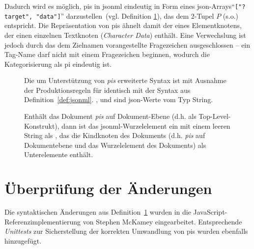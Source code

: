 Dadurch wird es möglich, \glspl{pi} in \acrshort{jsonml} eindeutig in Form eines \acrshort{json}-Arrays\linebreak{}\enquote{\texttt{["?target", "data"]}} darzustellen~(vgl. Definition \ref{def:jsonmlpi}), das dem 2-Tupel $P$ (s.o.) entspricht. Die Repräsentation von \glspl{pi} ähnelt damit der eines Elementknotens, der einen einzelnen Textknoten (\emph{Character Data}) enthält. Eine Verwechslung ist jedoch durch das dem Zielnamen vorangestellte Fragezeichen ausgeschlossen -- ein Tag-Name darf nicht mit einem Fragezeichen beginnen, wodurch die Kategorisierung als \gls{pi} eindeutig ist.  \begin{figure}[h]
    \begin{definition}
        \label{def:jsonmlpi}

        Die um Unterstützung von \emph{\glspl{pi}} erweiterte Syntax ist mit Ausnahme der Produktionsregeln für  identisch mit der Syntax aus Definition~\ref{def:jsonml}.
        ,  und  sind \acrshort{json}-Werte vom Typ String.

        \begin{grammar}
            
        \end{grammar}

        Enthält das Dokument \emph{\glspl{pi}} auf Dokument-Ebene (d.h. als Top-Level-Konstrukt), dann ist das \acrshort{jsonml}-Wurzelelement ein  mit einem leeren String als , das die Kindknoten des Dokuments (d.h. \emph{\glspl{pi}} auf Dokumentebene und das Wurzelelement des Dokuments) als Unterelemente enthält.
    \end{definition}
\end{figure}

\section{Überprüfung der Änderungen}

Die syntaktischen Änderungen aus Definition~\ref{def:jsonmlpi} wurden in die JavaScript-Referenz\-implementierung von Stephen McKamey eingearbeitet. Entsprechende \emph{Unittests} zur Sicherstellung der korrekten Umwandlung von \glspl{pi} wurden ebenfalls hinzugefügt.

